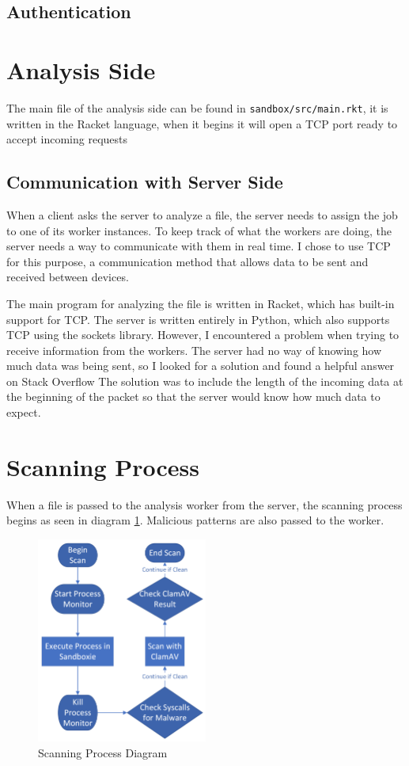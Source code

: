 \subsection{Authentication}

\section{Analysis Side}
The main file of the analysis side can be found in \texttt{sandbox/src/main.rkt},
it is written in the Racket language, when it begins it will open a TCP port ready to accept incoming requests

\subsection{Communication with Server Side}
When a client asks the server to analyze a file,
the server needs to assign the job to one of its worker instances.
To keep track of what the workers are doing,
the server needs a way to communicate with them in real time.
I chose to use TCP for this purpose,
a communication method that allows data to be sent and received between devices.

The main program for analyzing the file is written in Racket,
which has built-in support for TCP. The server is written entirely in Python,
which also supports TCP using the sockets library.
However, I encountered a problem when trying to receive information from the workers.
The server had no way of knowing how much data was being sent,
so I looked for a solution and found a
helpful answer on Stack Overflow \cite{chqrlie:2022}
The solution was to include the length of the incoming
data at the beginning of the packet
so that the server would know how much data to expect.

\section{Scanning Process}
When a file is passed to the analysis worker from the server,
the scanning process begins as seen in diagram \ref{image:scanningProcess}.
Malicious patterns are also passed to the worker.

\begin{figure}[h!]
    \centering
    \includegraphics[width=0.5\textwidth]{images/diagrams/scan_process}
    \caption{Scanning Process Diagram}
    \label{image:scanningProcess}
\end{figure}

